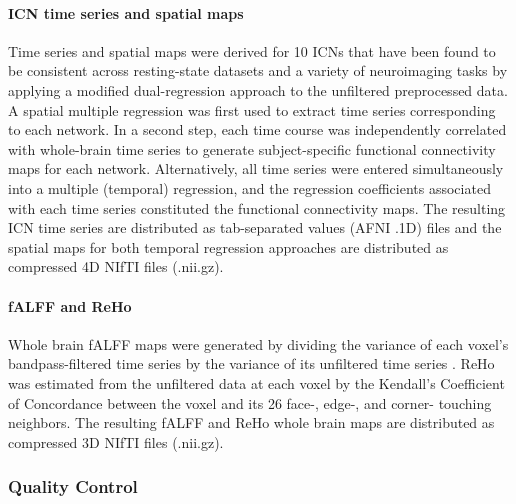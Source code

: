 \documentclass[preprint,12pt,3p]{elsarticle}
\begin{document}
\paragraph{ICN time series and spatial maps} Time series and spatial maps were derived for 10 ICNs that have been found to be consistent across resting-state datasets and a variety of neuroimaging tasks \cite{smith2009correspondence} by applying a modified dual-regression approach \cite{Beckmann2009dualreg} to the unfiltered preprocessed data. A spatial multiple regression was first used to extract time series corresponding to each network. In a second step, each time course was independently correlated with whole-brain time series to generate subject-specific functional connectivity maps for each network. Alternatively, all time series were entered simultaneously into a multiple (temporal) regression, and the regression coefficients associated with each time series constituted the functional connectivity maps. The resulting ICN time series are distributed as tab-separated values (AFNI .1D) files and the spatial maps for both temporal regression approaches are distributed as compressed 4D NIfTI files (.nii.gz).

\paragraph{fALFF and ReHo} Whole brain fALFF maps were generated by dividing the variance of each voxel's bandpass-filtered time series by the variance of its unfiltered time series \cite{zuo2008falff}. ReHo was estimated from the unfiltered data at each voxel by the Kendall's Coefficient of Concordance \cite{kendall1939w} between the voxel and its 26 face-, edge-, and corner- touching neighbors. The resulting fALFF and ReHo whole brain maps are distributed as compressed 3D NIfTI files (.nii.gz).

\subsubsection{Quality Control} 
\end{document}
